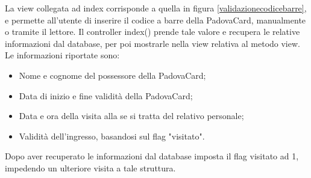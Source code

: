 \begin{table}[H]
\centering
{}
\caption{Controller:VisitsController}
\end{table}
La view collegata ad index corrisponde a quella in figura \ref{validazionecodicebarre}, e permette all'utente di inserire il codice a barre della PadovaCard, manualmente o tramite il lettore.
Il controller index() prende tale valore e recupera le relative informazioni dal database, per poi mostrarle nella view relativa al metodo view. Le informazioni riportate sono:
\begin{itemize}
\item Nome e cognome del possessore della PadovaCard;
\item Data di inizio e fine validità della PadovaCard;
\item Data e ora della visita alla \cappella se si tratta del relativo personale;
\item Validità dell'ingresso, basandosi sul flag "visitato".
\end{itemize}
Dopo aver recuperato le informazioni dal database imposta il flag visitato ad 1, impedendo un ulteriore visita a tale struttura.


